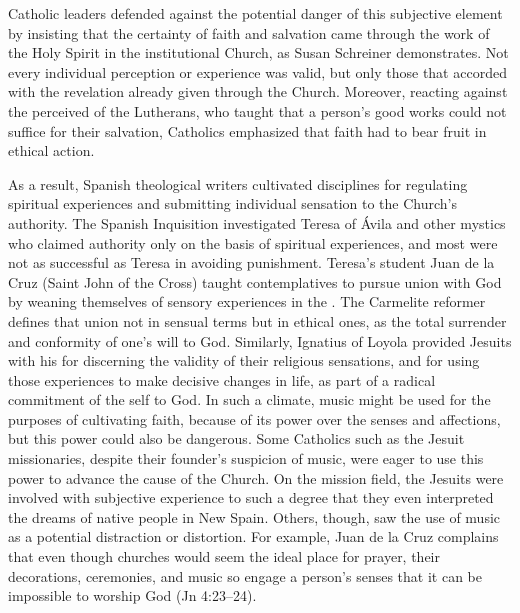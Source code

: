 Catholic leaders defended against the potential danger of this subjective
element by insisting that the certainty of faith and salvation came through the
work of the Holy Spirit in the institutional Church, as Susan Schreiner
demonstrates.%
    \Autocite[131--208]{Schreiner:Certainty}
Not every individual perception or experience was valid, but only those that
accorded with the revelation already given through the Church.
Moreover, reacting against the perceived  of the Lutherans, who
taught that a person's good works could not suffice for their salvation,
Catholics emphasized that faith had to bear fruit in ethical action.

As a result, Spanish theological writers cultivated disciplines for regulating
spiritual experiences and submitting individual sensation to the Church's
authority.
The Spanish Inquisition investigated Teresa of Ávila and other mystics who
claimed authority only on the basis of spiritual experiences, and most were not
as successful as Teresa in avoiding punishment.%
    \Autocites{Ahlgren:TeresaPolitics}{Francisca:Inquisition}
Teresa's student Juan de la Cruz (Saint John of the Cross) taught contemplatives
to pursue union with God by weaning themselves of sensory experiences in the
.
The Carmelite reformer defines that union not in sensual terms but in ethical
ones, as the total surrender and conformity of one's will to God.%
    \Autocite
    [, , ]
    {JuandelaCruz:Subida}
Similarly, Ignatius of Loyola provided Jesuits with his  for discerning the validity of their religious sensations, and for
using those experiences to make decisive changes in life, as part of a radical
commitment of the self to God.%
    \Autocite[]{Schreiner:Certainty}
In such a climate, music might be used for the purposes of cultivating faith,
because of its power over the senses and affections, but this power could also
be dangerous.
Some Catholics such as the Jesuit missionaries, despite their founder's
suspicion of music, were eager to use this power to advance the cause of the
Church.
On the mission field, the Jesuits were involved with subjective experience to
such a degree that they even interpreted the dreams of native people in New
Spain.%
    \Autocite[XXX]{Bailey:Art}
Others, though, saw the use of music as a potential distraction or distortion.
For example, Juan de la Cruz complains that even though churches would seem the
ideal place for prayer, their decorations, ceremonies, and music so engage a
person's senses that it can be impossible to worship God  (Jn 4:23--24).%
    \Autocite
    [, , ]
    {JuandelaCruz:Subida}

